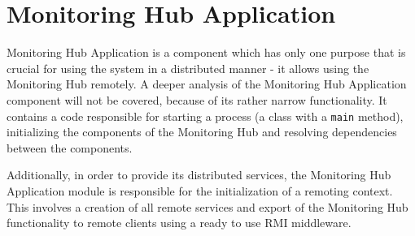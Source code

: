 %
\section{Monitoring Hub Application}
\label{sec:arch_monitoring_hub_application}

Monitoring Hub Application is a component which has only one purpose that is crucial for using the system in a distributed manner - it allows using the Monitoring Hub remotely. A deeper analysis of the Monitoring Hub Application component will not be covered, because of its rather narrow functionality. It contains a code responsible for starting a process (a class with a \texttt{main} method), initializing the components of the Monitoring Hub and resolving dependencies between the components.

Additionally, in order to provide its distributed services, the Monitoring Hub Application module is responsible for the initialization of a remoting context. This involves a creation of all remote services and export of the Monitoring Hub functionality to remote clients using a ready to use RMI middleware.

